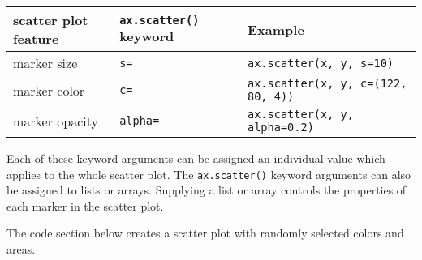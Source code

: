 \documentclass{book}
\newcommand{\passthrough}[1]{#1}
\begin{document}
\begin{longtable}[]{@{}lll@{}}
\toprule
scatter plot feature & \passthrough{\lstinline!ax.scatter()!} keyword &
Example\tabularnewline
\midrule
\endhead
marker size & \passthrough{\lstinline!s=!} &
\passthrough{\lstinline!ax.scatter(x, y, s=10)!}\tabularnewline
marker color & \passthrough{\lstinline!c=!} &
\passthrough{\lstinline!ax.scatter(x, y, c=(122, 80, 4))!}\tabularnewline
marker opacity & \passthrough{\lstinline!alpha=!} &
\passthrough{\lstinline!ax.scatter(x, y, alpha=0.2)!}\tabularnewline
\bottomrule
\end{longtable}

Each of these keyword arguments can be assigned an individual value
which applies to the whole scatter plot. The
\passthrough{\lstinline!ax.scatter()!} keyword arguments can also be
assigned to lists or arrays. Supplying a list or array controls the
properties of each marker in the scatter plot.

The code section below creates a scatter plot with randomly selected
colors and areas.
    
\end{document}
